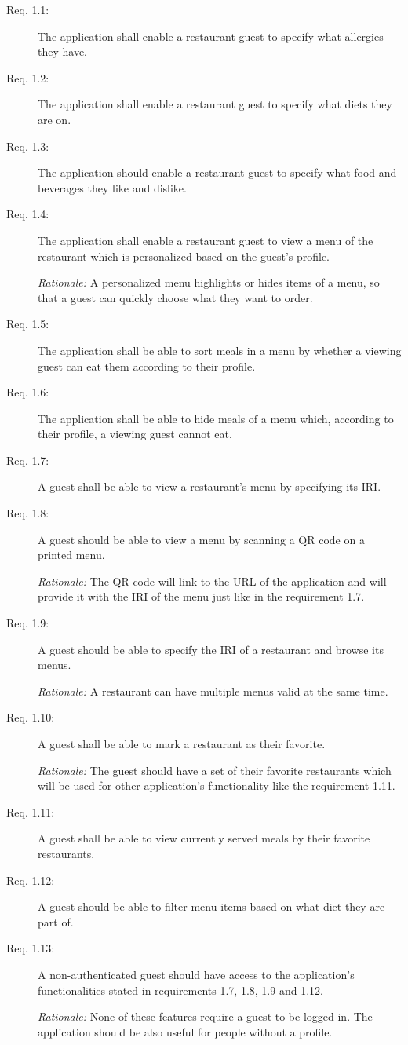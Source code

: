 \begin{description}
    \item [Req. 1.1:] The application shall enable a restaurant guest to specify what allergies they have.
    \item [Req. 1.2:] The application shall enable a restaurant guest to specify what diets they are on.
    \item [Req. 1.3:] The application should enable a restaurant guest to specify what food and beverages they like and dislike.
    \item [Req. 1.4:] The application shall enable a restaurant guest to view a menu of the restaurant which is personalized based on the guest's profile.

    \emph{Rationale:} A personalized menu highlights or hides items of a menu, so that a guest can quickly choose what they want to order. 
    \item [Req. 1.5:] The application shall be able to sort meals in a menu by whether a viewing guest can eat them according to their profile.
    \item [Req. 1.6:] The application shall be able to hide meals of a menu which, according to their profile, a viewing guest cannot eat.
    \item [Req. 1.7:] A guest shall be able to view a restaurant's menu by specifying its IRI.
    \item [Req. 1.8:] A guest should be able to view a menu by scanning a QR code on a printed menu.

    \emph{Rationale:} The QR code will link to the URL of the application and will provide it with the IRI of the menu just like in the requirement 1.7.
    \item [Req. 1.9:] A guest should be able to specify the IRI of a restaurant and browse its menus.

    \emph{Rationale:} A restaurant can have multiple menus valid at the same time. 
    \item [Req. 1.10:] A guest shall be able to mark a restaurant as their favorite.
    
    \emph{Rationale:} The guest should have a set of their favorite restaurants which will be used for other application's functionality like the requirement 1.11.
    \item [Req. 1.11:] A guest shall be able to view currently served meals by their favorite restaurants.
    \item [Req. 1.12:] A guest should be able to filter menu items based on what diet they are part of.
    \item [Req. 1.13:] A non-authenticated guest should have access to the application's functionalities stated in requirements 1.7, 1.8, 1.9 and 1.12. 

    \emph{Rationale:} None of these features require a guest to be logged in. The application should be also useful for people without a profile.
\end{description}

